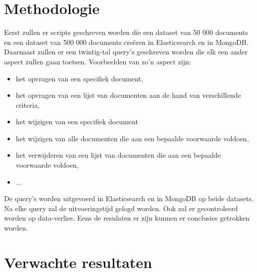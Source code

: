 \documentclass[fleqn,10pt]{voorstel}
\begin{document}
	\section{Methodologie}
	\label{sec:methodologie}
	
	Eerst zullen er scripts geschreven worden die een dataset van 50 000 documents en een dataset van 500 000 documents creëren in Elasticsearch en in MongoDB. Daarnaast zullen er een twintig-tal query's geschreven worden die elk een ander aspect zullen gaan toetsen. Voorbeelden van zo'n aspect zijn:
	
	\begin{itemize}
		\item het opvragen van een specifiek document,
		\item het opvragen van een lijst van documenten aan de hand van verschillende criteria,
		\item het wijzigen van een specifiek document
		\item het wijzigen van alle documenten die aan een bepaalde voorwaarde voldoen,
		\item het verwijderen van een lijst van documenten die aan een bepaalde voorwaarde voldoen,
		\item ...
	\end{itemize}
	\linebreak
	De query's worden uitgevoerd in Elasticsearch en in MongoDB op beide datasets. Na elke query zal de uitvoeringstijd gelogd worden. Ook zal er gecontroleerd worden op data-verlies. Eens de resulaten er zijn kunnen er conclusies getrokken worden.
	
	\section{Verwachte resultaten}
	\label{sec:verwachte_resultaten}
	
\end{document}
